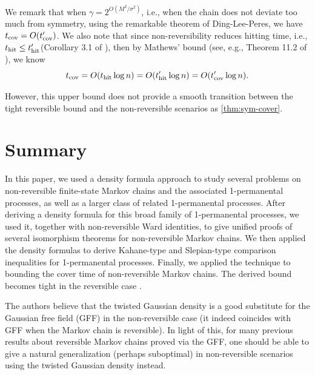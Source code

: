 \documentclass[a4paper, 11pt]{article}
\newcommand{\cov}{\textnormal{cov}}
\begin{document}
We remark that when $\gamma= 2^{O(M^2/\sigma^2)}$, i.e., when the chain does not deviate too much from symmetry, using the remarkable theorem of Ding-Lee-Peres\cite{dlp11}, we have $t_\cov=O(t_\cov')$. We also note that since non-reversibility reduces hitting time, i.e., $t_{\textnormal{hit}}\leq t_{\textnormal{hit}}'$(Corollary 3.1 of \cite{hm17}), then by Mathews' bound (see, e.g., Theorem 11.2 of \cite{lp17}), we know
\[t_\cov=O(t_\textnormal{hit}\log n)=O(t_\textnormal{hit}'\log n)=O(t_\cov'\log n).\]

However, this upper bound does not provide a smooth transition between the tight reversible bound and the non-reversible scenarios as \cref{thm:sym-cover}.

\section{Summary}

In this paper, we used a density formula approach to study several problems on non-reversible finite-state Markov chains and the associated 1-permanental processes, as well as a larger class of related 1-permanental processes.
After deriving a density formula for this broad family of 1-permanental processes, we used it, together with non-reversible Ward identities, to give unified proofs of several isomorphism theorems for non-reversible Markov chains. We then applied the density formulas to derive Kahane-type and
Slepian-type comparison inequalities for 1-permanental processes. Finally, we
applied the technique to bounding the cover time of non-reversible Markov chains. The derived bound becomes tight in the reversible case \cite{dlp11}.

The authors believe that the twisted Gaussian density is a good substitute for the Gaussian free field (GFF) in the non-reversible case (it indeed coincides with GFF when the Markov chain is reversible). In light of this, for many previous results about reversible Markov chains proved via the GFF, one should be able to give a natural generalization (perhaps suboptimal)
in non-reversible scenarios using the twisted Gaussian density instead.
\end{document}
